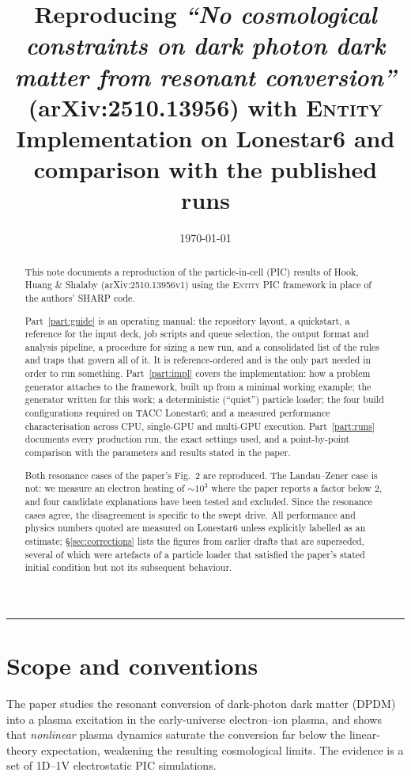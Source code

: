 \documentclass[11pt,a4paper]{article}
\title{\bfseries Reproducing \textit{``No cosmological constraints on dark photon
dark matter from resonant conversion''} (arXiv:2510.13956) with \textsc{Entity}\\[4pt]
\large Implementation on Lonestar6 and comparison with the published runs}
\author{}
\date{\today}
\begin{document}
\maketitle

\begin{abstract}
\noindent
This note documents a reproduction of the particle-in-cell (PIC) results of Hook,
Huang \& Shalaby (arXiv:2510.13956v1) using the \textsc{Entity} PIC framework in
place of the authors' \textsc{SHARP} code.

Part~\ref{part:guide} is an operating manual: the repository layout, a quickstart, a
reference for the input deck, job scripts and queue selection, the output format and
analysis pipeline, a procedure for sizing a new run, and a consolidated list of the
rules and traps that govern all of it. It is reference-ordered and is the only part
needed in order to run something.
Part~\ref{part:impl} covers the implementation: how a problem generator attaches to
the framework, built up from a minimal working example; the generator written for this
work; a deterministic (``quiet'') particle loader; the four build
configurations required on TACC Lonestar6; and a measured performance characterisation
across CPU, single-GPU and multi-GPU execution. Part~\ref{part:runs} documents every
production run, the exact settings used, and a point-by-point comparison with the
parameters and results stated in the paper.

Both resonance cases of the paper's Fig.~2 are reproduced. The Landau--Zener case is
not: we measure an electron heating of ${\sim}10^3$ where the paper reports a factor
below $2$, and four candidate explanations have been tested and excluded. Since the
resonance cases agree, the disagreement is specific to the swept drive. All
performance and physics numbers quoted are measured on Lonestar6 unless explicitly
labelled as an estimate; \S\ref{sec:corrections} lists the figures from earlier drafts
that are superseded, several of which were artefacts of a particle loader that
satisfied the paper's stated initial condition but not its subsequent behaviour.
\end{abstract}

\tableofcontents
\bigskip\hrule\bigskip

\section{Scope and conventions}

The paper studies the resonant conversion of dark-photon dark matter (DPDM) into a
plasma excitation in the early-universe electron--ion plasma, and shows that
\emph{nonlinear} plasma dynamics saturate the conversion far below the linear-theory
expectation, weakening the resulting cosmological limits. The evidence is a set of
1D--1V electrostatic PIC simulations.
\end{document}
